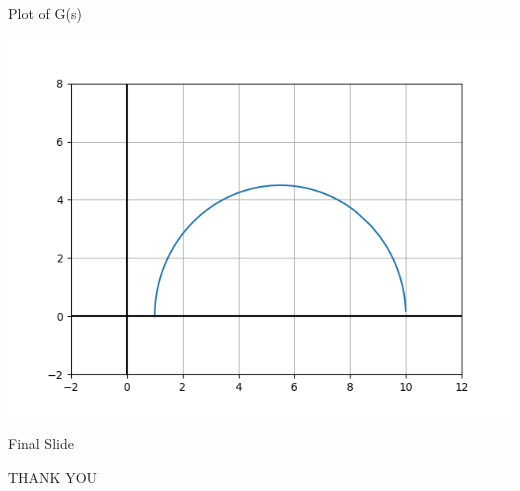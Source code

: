 \documentclass{beamer}
\begin{document}
\begin{frame}{Plot of G(s)}
\begin{center}
      \includegraphics[scale =0.65]{PPT1_Control.png}
\end{center}

\end{frame}

\begin{frame}{Final Slide}
\begin{center}
    THANK YOU
\end{center}
    
\end{frame}
    
\end{document}
